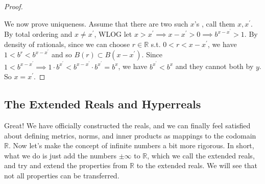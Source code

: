 \begin{proof}
\begin{enumerate}
    \end{enumerate}
    We now prove uniqueness. Assume that there are two such $x$'s , call them $x, x^\prime$. By total ordering and $x \neq x^\prime$, WLOG let $x > x^\prime \implies x - x^\prime > 0 \implies b^{x - x^\prime} > 1$. By density of rationals, since we can choose $r \in \mathbb{R}$ s.t. $0 < r < x - x^\prime$, we have $1 < b^r < b^{x - x^\prime}$ and so $B(r) \subset B(x - x^\prime)$. Since $1 < b^{x - x^\prime} \implies 1 \cdot b^{x^\prime} < b^{x - x^\prime} \cdot b^{x^\prime} = b^x$, we have $b^{x^\prime} < b^x$ and they cannot both by $y$. So $x = x^\prime$. 
  \end{proof}

\subsection{The Extended Reals and Hyperreals}

  Great! We have officially constructed the reals, and we can finally feel satisfied about defining metrics, norms, and inner products as mappings to the codomain $\mathbb{R}$. Now let's make the concept of infinite numbers a bit more rigorous. In short, what we do is just add the numbers $\pm \infty$ to $\mathbb{R}$, which we call the extended reals, and try and extend the properties from $\mathbb{R}$ to the extended reals. We will see that not all properties can be transferred. 


